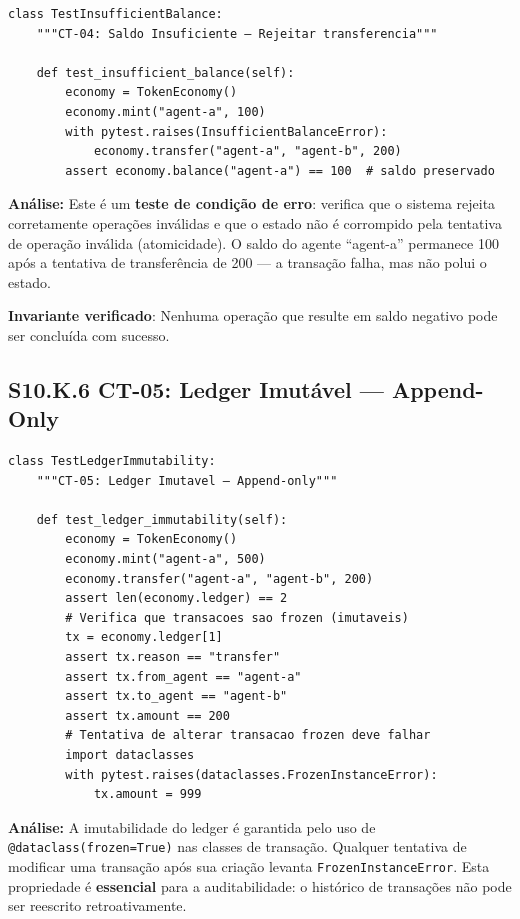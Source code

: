 \begin{verbatim}
class TestInsufficientBalance:
    """CT-04: Saldo Insuficiente — Rejeitar transferencia"""

    def test_insufficient_balance(self):
        economy = TokenEconomy()
        economy.mint("agent-a", 100)
        with pytest.raises(InsufficientBalanceError):
            economy.transfer("agent-a", "agent-b", 200)
        assert economy.balance("agent-a") == 100  # saldo preservado
\end{verbatim}

\textbf{Análise:} Este é um \textbf{teste de condição de erro}: verifica que o sistema rejeita corretamente operações inválidas e que o estado não é corrompido pela tentativa de operação inválida (atomicidade). O saldo do agente ``agent-a'' permanece 100 após a tentativa de transferência de 200 --- a transação falha, mas não polui o estado.

\textbf{Invariante verificado}: Nenhuma operação que resulte em saldo negativo pode ser concluída com sucesso.

\subsection*{S10.K.6 CT-05: Ledger Imutável --- Append-Only}

\begin{verbatim}
class TestLedgerImmutability:
    """CT-05: Ledger Imutavel — Append-only"""

    def test_ledger_immutability(self):
        economy = TokenEconomy()
        economy.mint("agent-a", 500)
        economy.transfer("agent-a", "agent-b", 200)
        assert len(economy.ledger) == 2
        # Verifica que transacoes sao frozen (imutaveis)
        tx = economy.ledger[1]
        assert tx.reason == "transfer"
        assert tx.from_agent == "agent-a"
        assert tx.to_agent == "agent-b"
        assert tx.amount == 200
        # Tentativa de alterar transacao frozen deve falhar
        import dataclasses
        with pytest.raises(dataclasses.FrozenInstanceError):
            tx.amount = 999
\end{verbatim}

\textbf{Análise:} A imutabilidade do ledger é garantida pelo uso de \texttt{@dataclass(frozen=True)} nas classes de transação. Qualquer tentativa de modificar uma transação após sua criação levanta \texttt{FrozenInstanceError}. Esta propriedade é \textbf{essencial} para a auditabilidade: o histórico de transações não pode ser reescrito retroativamente.

